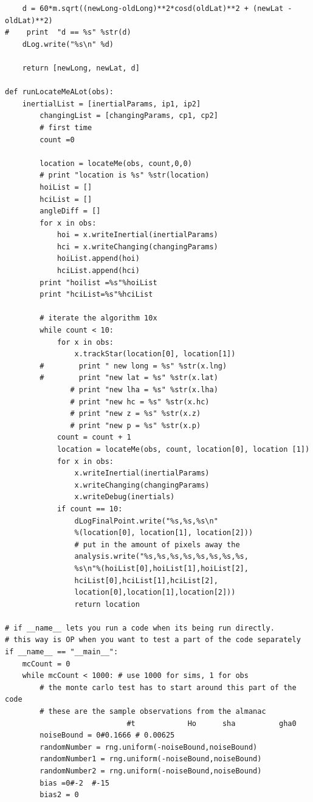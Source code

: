 \documentclass[12pt,a4paper]{book}
\begin{document}
\begin{appendices}
\begin{verbatim}
    d = 60*m.sqrt((newLong-oldLong)**2*cosd(oldLat)**2 + (newLat - oldLat)**2)
#    print  "d == %s" %str(d)
    dLog.write("%s\n" %d)
    
    return [newLong, newLat, d]

def runLocateMeALot(obs):
	inertialList = [inertialParams, ip1, ip2]
        changingList = [changingParams, cp1, cp2]
        # first time
        count =0 

        location = locateMe(obs, count,0,0)
        # print "location is %s" %str(location)
        hoiList = []
        hciList = []
        angleDiff = []
        for x in obs:
            hoi = x.writeInertial(inertialParams)
            hci = x.writeChanging(changingParams)
            hoiList.append(hoi)
            hciList.append(hci)
        print "hoilist =%s"%hoiList
        print "hciList=%s"%hciList

        # iterate the algorithm 10x
        while count < 10:
            for x in obs:
                x.trackStar(location[0], location[1])
        #        print " new long = %s" %str(x.lng)
        #        print "new lat = %s" %str(x.lat)
               # print "new lha = %s" %str(x.lha)
               # print "new hc = %s" %str(x.hc)
               # print "new z = %s" %str(x.z)
               # print "new p = %s" %str(x.p)
            count = count + 1
            location = locateMe(obs, count, location[0], location [1]) 
            for x in obs:
                x.writeInertial(inertialParams)
                x.writeChanging(changingParams)
                x.writeDebug(inertials)
            if count == 10:
                dLogFinalPoint.write("%s,%s,%s\n" 
                %(location[0], location[1], location[2]))
                # put in the amount of pixels away the 
                analysis.write("%s,%s,%s,%s,%s,%s,%s,%s,
                %s\n"%(hoiList[0],hoiList[1],hoiList[2],
                hciList[0],hciList[1],hciList[2],
                location[0],location[1],location[2]))
                return location

# if __name__ lets you run a code when its being run directly. 
# this way is OP when you want to test a part of the code separately
if __name__ == "__main__":
    mcCount = 0
    while mcCount < 1000: # use 1000 for sims, 1 for obs
        # the monte carlo test has to start around this part of the code
        # these are the sample observations from the almanac
                            #t            Ho      sha          gha0
        noiseBound = 0#0.1666 # 0.00625
        randomNumber = rng.uniform(-noiseBound,noiseBound) 
        randomNumber1 = rng.uniform(-noiseBound,noiseBound)
        randomNumber2 = rng.uniform(-noiseBound,noiseBound)
        bias =0#-2  #-15 
        bias2 = 0


\end{verbatim}
\end{appendices}
\end{document}
